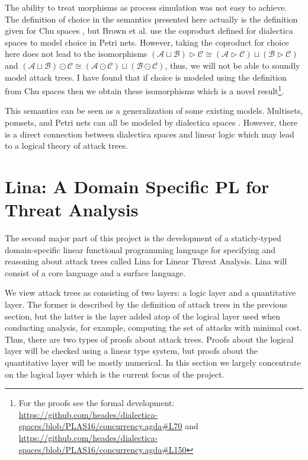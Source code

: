 \documentclass{sigplanconf}
\newcommand{\cat}[1]{\mathcal{#1}}
\begin{document}
The ability to treat morphisms as process simulation was not easy to
achieve.  The definition of choice in the semantics presented here
actually is the definition given for Chu spaces \cite{Gupta:1994}, but
Brown et al. use the coproduct defined for dialectica spaces to model
choice in Petri nets.  However, taking the coproduct for choice here
does not lead to the isomorphisms $(\cat{A} \sqcup \cat{B}) \rhd
\cat{C} \cong (\cat{A} \rhd \cat{C}) \sqcup (\cat{B} \rhd \cat{C})$
and $(\cat{A} \sqcup \cat{B}) \odot \cat{C} \cong (\cat{A} \odot
\cat{C}) \sqcup (\cat{B} \odot \cat{C})$, thus, we will not be able to
soundly model attack trees.  I have found that if choice is modeled
using the definition from Chu spaces \cite{Gupta:1994} then we obtain
these isomorphisms which is a novel result\footnote{For the proofs see
  the formal development:
  \url{https://github.com/heades/dialectica-spaces/blob/PLAS16/concurrency.agda\#L70}
  and
  \url{https://github.com/heades/dialectica-spaces/blob/PLAS16/concurrency.agda\#L150}}.

This semantics can be seen as a generalization of some existing
models.  Multisets, pomsets, and Petri nets can all be modeled by
dialectica spaces \cite{Brown:1991,Gupta:1994}.  However, there is a
direct connection between dialectica spaces and linear logic which
may lead to a logical theory of attack trees.

\section{Lina: A Domain Specific PL for Threat Analysis}
\label{sec:lina:_a_domain_specific_pl_for_threat_analysis}

The second major part of this project is the development of a
staticly-typed domain-specific linear functional programming language
for specifying and reasoning about attack trees called Lina for Linear
Threat Analysis.  Lina will consist of a core language and a surface
language.

We view attack trees as consisting of two layers: a logic layer and a
quantitative layer.  The former is described by the definition of
attack trees in the previous section, but the latter is the layer
added atop of the logical layer used when conducting analysis, for
example, computing the set of attacks with minimal cost.  Thus, there
are two types of proofs about attack trees.  Proofs about the logical
layer will be checked using a linear type system, but proofs about the
quantitative layer will be mostly numerical. In this section we
largely concentrate on the logical layer which is the current focus of
the project.
\end{document}
